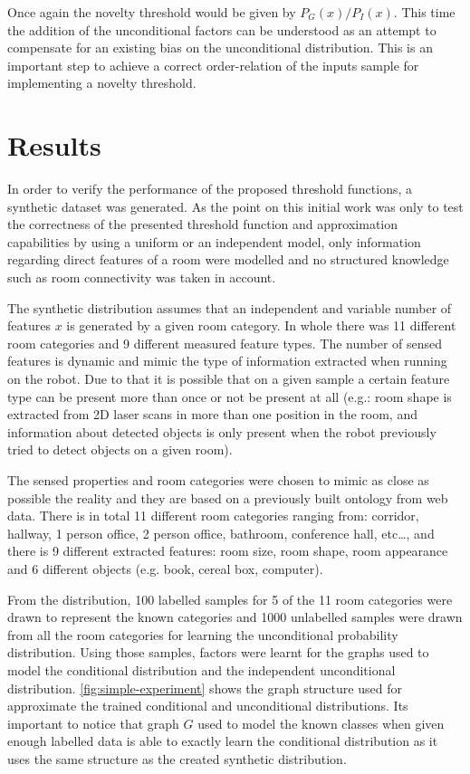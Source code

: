 \documentclass[runningheads,a4paper]{llncs}
\begin{document}
Once again the novelty threshold would be given by $P_G(x)/P_I(x)$.
This time the addition of the unconditional factors can be understood as an
attempt to compensate for an existing bias on the unconditional distribution.
This is an important step to achieve a correct order-relation of the inputs sample
for implementing a novelty threshold.


\section{Results}
\label{sec:results}

In order to verify the performance of the proposed threshold functions, a synthetic dataset
was generated. As the point on this initial work was only to test the correctness of
the presented threshold function and approximation capabilities by using a uniform or
an independent model, only information regarding direct features of a room were
modelled and no structured knowledge such as room connectivity was taken
in account.

The synthetic distribution assumes that an independent and variable number of features
$x$ is generated by a given room category.
In whole there was 11 different room categories and 9 different measured feature
types. The number of sensed features is dynamic and mimic the type of information
extracted when running on the robot. Due to that it is possible that on a given sample
a certain feature type can be present more than once or not be present at all
(e.g.: room shape is extracted from 2D laser scans in more than one position in the room,
and information about detected objects is only present when the robot previously tried to
detect objects on a given room).

The sensed properties and room categories were chosen to mimic as close as possible
the reality and they are based on a previously built ontology from web data.
There is in total 11 different room categories ranging from: corridor, hallway,
1 person office, 2 person office, bathroom, conference hall, etc\dots, and there is
9 different extracted features: room size, room shape, room appearance and 6 different objects
(e.g. book, cereal box, computer).

From the distribution, 100 labelled samples for 5 of the 11 room categories were
drawn to represent the known categories and 1000 unlabelled samples were drawn from
all the room categories for learning the unconditional probability distribution.
Using those samples, factors were learnt for the graphs used to model the
conditional distribution and the independent unconditional distribution.
\autoref{fig:simple-experiment} shows the graph structure used for approximate the
trained conditional and unconditional distributions.
Its important to notice that graph $G$ used to model the known classes when given
enough labelled data is able to exactly learn the conditional distribution as it
uses the same structure as the created synthetic distribution.
\end{document}
